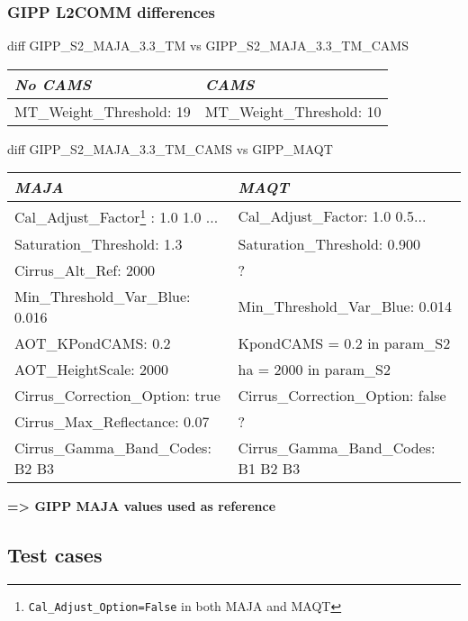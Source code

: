 \documentclass[8pt]{beamer}
\begin{document}
\begin{frame}
\frametitle{GIPP L2COMM differences}
	
	\begin{block}{diff GIPP\_S2\_MAJA\_3.3\_TM vs GIPP\_S2\_MAJA\_3.3\_TM\_CAMS}
		\begin{tabular}{|l|l|}
			\hline 
			\textit{No CAMS} 					& \textit{CAMS} \\ 
			\hline 
			MT\_Weight\_Threshold: 19 			& MT\_Weight\_Threshold: 10 \\ 
			\hline 
		\end{tabular} 
	\end{block}
	
	\begin{block}{diff GIPP\_S2\_MAJA\_3.3\_TM\_CAMS vs GIPP\_MAQT}
		\begin{tabular}{|l|l|}
			\hline 
			\textit{MAJA} & \textit{MAQT} \\ 
			\hline 
			Cal\_Adjust\_Factor\footnote{\texttt{Cal\_Adjust\_Option=False} in both MAJA and MAQT} : 1.0 1.0 ... 							& Cal\_Adjust\_Factor: 1.0 0.5... \\ 
			\hline 
			Saturation\_Threshold: 1.3 			& Saturation\_Threshold: 0.900 \\ 
			\hline 
			Cirrus\_Alt\_Ref: 2000 				& ? \\ 
			\hline 
			Min\_Threshold\_Var\_Blue: 0.016 	& Min\_Threshold\_Var\_Blue: 0.014 \\ 
			\hline 
			AOT\_KPondCAMS: 0.2 					& KpondCAMS = 0.2 in param\_S2\\ 
			\hline 
			AOT\_HeightScale: 2000 				& ha = 2000 in param\_S2 \\ 
			\hline 
			Cirrus\_Correction\_Option: true 	& Cirrus\_Correction\_Option: false \\ 
			\hline 
			Cirrus\_Max\_Reflectance: 0.07 		& ? \\ 
			\hline 
			Cirrus\_Gamma\_Band\_Codes: B2 B3	& Cirrus\_Gamma\_Band\_Codes: B1 B2 B3 \\ 
			\hline 
		\end{tabular} 
	\end{block}
	
	\textbf{=> GIPP MAJA values used as reference}	

\end{frame}

\subsection{Test cases}
\end{document}
